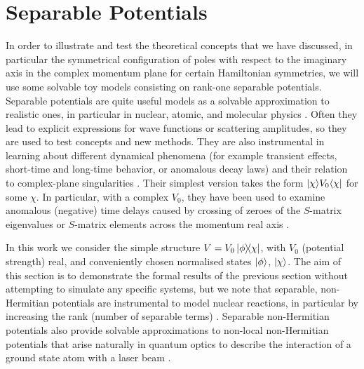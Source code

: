 \section{Separable Potentials}
\label{sec:chapter2_separablePotentials}
%
%
In order to illustrate and test the theoretical concepts that we have discussed, in particular the
symmetrical configuration of poles with respect to the imaginary axis in the complex momentum plane for certain Hamiltonian symmetries, we will use some solvable toy models consisting on rank-one separable potentials.
Separable potentials are quite useful models as a solvable approximation to realistic ones, in particular in nuclear, atomic, and molecular physics \cite{Popov2019}.
Often they lead to explicit expressions
for wave functions or scattering amplitudes, so they are used to test concepts and new methods.
They are also instrumental in learning about different dynamical phenomena (for example transient effects, short-time and long-time behavior, or anomalous decay laws)  and their relation to complex-plane singularities
\cite{Muga1990,Muga1996,Muga1996a,Muga1998}. Their simplest version takes the form
$|\chi\rangle V_0\langle\chi|$ for some  $\chi$.   In particular, with a complex $V_0$,
they have been used to examine anomalous (negative) time delays caused by  crossing of zeroes of the $S$-matrix eigenvalues or $S$-matrix elements across the momentum real axis \cite{Muga1998a}.

In this work we consider the simple structure
$V=V_0 \ketbra{\phi}{\chi}$, with $V_0$ (potential strength) real, and conveniently chosen normalised states $\ket{\phi}$, $\ket{\chi}$.
The aim of this section is to demonstrate the formal results of the previous section without attempting to simulate any specific systems, but we note that separable, non-Hermitian potentials are instrumental to model nuclear reactions, in particular  by increasing the rank (number of separable terms) \cite{Hlophe2017}.
Separable non-Hermitian potentials also provide solvable approximations to non-local non-Hermitian potentials that arise naturally in quantum optics to describe the interaction of a ground state atom with a laser beam \cite{Ruschhaupt2004a}.

